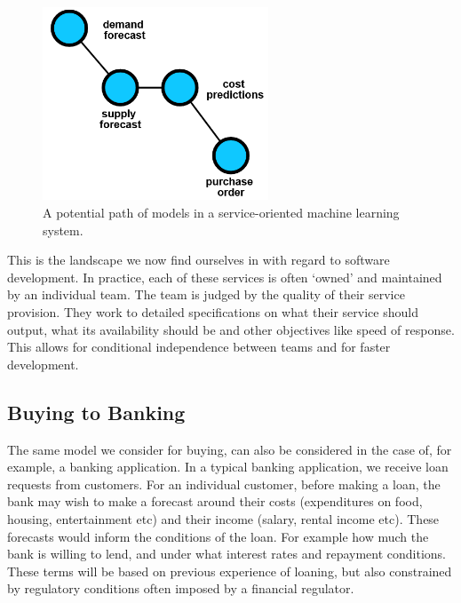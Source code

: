 \documentclass[a4paper]{caesar_book}
\begin{document}
\begin{figure}[htbp]%
	\includegraphics[width=0.6\textwidth,keepaspectratio]{pictures/buying_3.PNG}%
	\caption*{A potential path of models in a service-oriented machine learning system.}%
\end{figure}%

This is the landscape we now find ourselves in with regard to software development. In practice, each of these services is often ‘owned’ and maintained by an individual team. The team is judged by the quality of their service provision. They work to detailed specifications on what their service should output, what its availability should be and other objectives like speed of response. This allows for conditional independence between teams and for faster development.

\subsection{Buying to Banking}

The same model we consider for buying, can also be considered in the case of, for example, a banking application. In a typical banking application, we receive loan requests from customers. For an individual customer, before making a loan, the bank may wish to make a forecast around their costs (expenditures on food, housing, entertainment etc) and their income (salary, rental income etc). These forecasts would inform the conditions of the loan. For example how much the bank is willing to lend, and under what interest rates and repayment conditions. These terms will be based on previous experience of loaning, but also constrained by regulatory conditions often imposed by a financial regulator.
\end{document}
